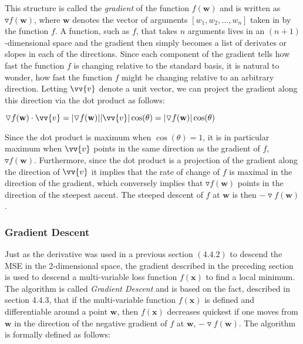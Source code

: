 \documentclass[titlepage]{article}
\begin{document}
\vskip 0.5cm 

\centerline{}

\vskip 0.5cm

\noindent
This structure is called the \emph{gradient} of the function $f(\mathbf{w})$ and is written as $\triangledown f(\mathbf{w})$, where $\mathbf{w}$ denotes the vector of arguments $[w_{1}, w_{2}, ..., w_{n}]$ taken in by the function $f$. A function, such as $f$, that takes $n$ arguments lives in an $(n+1)$-dimensional space and the gradient then simply becomes a list of derivates or slopes in each of the directions. Since each component of the gradient tells how fast the function $f$ is changing relative to the standard basis, it is natural to wonder, how fast the function $f$ might be changing relative to an arbitrary direction. Letting $\vv{v}$ denote a unit vector, we can project the gradient along this direction via the dot product as follows:

\vskip 0.5cm

\centerline{$\triangledown f(\mathbf{w}) \cdot \vv{v} = |\triangledown f(\mathbf{w})||\vv{v}|\cos(\theta) = |\triangledown f(\mathbf{w})|\cos(\theta)$}

\vskip 0.5cm

\noindent
Since the dot product is maximum when $\cos(\theta) = 1$, it is in particular maximum when $\vv{v}$ points in the same direction as the gradient of $f$, $\triangledown f(\mathbf{w})$. Furthermore, since the dot product is a projection of the gradient along the direction of $\vv{v}$ it implies that the rate of change of $f$ is maximal in the direction of the gradient, which conversely implies that $\triangledown f(\mathbf{w})$ points in the direction of the steepest ascent. The steeped descent of $f$ at $\mathbf{w}$ is then $-\triangledown f(\mathbf{w})$.

\newpage

\subsubsection{Gradient Descent}

\vskip 0.2cm

\noindent
Just as the derivative was used in a previous section $(4.4.2)$ to descend the MSE in the 2-dimensional space, the gradient described in the preceding section is used to descend a multi-variable loss function $f(\mathbf{x})$ to find a local minimum. The algorithm is called \emph{Gradient Descent} \cite{skansi} and is based on the fact, described in section 4.4.3, that if the multi-variable function $f(\mathbf{x})$ is defined and differentiable around a point $\mathbf{w}$, then $f(\mathbf{x})$ decreases quickest if one moves from $\mathbf{w}$ in the direction of the negative gradient of $f$ at $\mathbf{w}$, $-\triangledown f(\mathbf{w})$. The algorithm is formally defined as follows:
\end{document}
